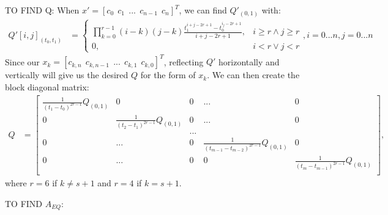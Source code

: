 \documentclass[11pt]{article}
\begin{document}
\newpage
TO FIND Q: \newline
When $x' = [c_0 \ \ c_1 \ \ ... \ \ c_{n-1} \ \ c_n]^T$, we can find $Q'_{(0, 1)}$ with: 
\begin{align}
\label{eqn: Q}  Q'[i, j]_{(t_0, t_1)} &= 
\begin{cases}
    \prod_{k = 0}^{r-1} {(i-k)(j-k)} \frac{ t_1^{i+j-2r+1} - t_0^{i_j-2r+1} }{i+j-2r+1}, & i \ge r \land j \ge r \\
    0, & i < r \lor j < r 
\end{cases}, i = 0...n, j = 0...n
\end{align}
Since our $x_k = [c_{k, n} \ \ c_{k, n-1} \ \ ... \ \ c_{k, 1} \ \ c_{k, 0}]^T$, reflecting $Q'$ horizontally and vertically will give us the desired $Q$ for the form of $x_k$. We can then create the block diagonal matrix:
\begin{align}
\label{eqn: Qkeyframes} Q &= 
\begin{bmatrix}
  \frac{1}{(t_1-t_{0})^{2r-1}} Q_{(0, 1)} & 0 & 0 & ... & 0 \\
  0 & \frac{1}{(t_2-t_{1})^{2r-1}} Q_{(0, 1)} & 0 & ... & 0 \\
  & & ... & &  \\
  0 & ... & 0 & \frac{1}{(t_{m-1}-t_{m-2})^{2r-1}} Q_{(0, 1)} & 0 \\
  0 & ... & 0 & 0 & \frac{1}{(t_m-t_{m-1})^{2r-1}} Q_{(0, 1)} \\ 
 \end{bmatrix},
\end{align}
where $r = 6$ if $k \ne s+1$ and $r = 4$ if $k=s+1$. 



\mbox{} \newline
\mbox{} \newline
TO FIND $A_{EQ}$: \newline
\end{document}
